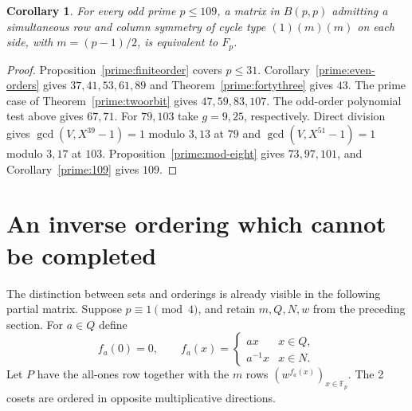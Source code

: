 \documentclass[11pt,a4paper]{article}
\newtheorem{corollary}[theorem]{Corollary}
\numberwithin{equation}{section}
\begin{document}
\begin{corollary}\label{prime:through109}
For every odd prime $p\le109$, a matrix in $B(p,p)$ admitting a simultaneous row and column symmetry of cycle type $(1)(m)(m)$ on each side, with $m=(p-1)/2$, is equivalent to $F_p$.
\end{corollary}
\begin{proof}
Proposition~\ref{prime:finiteorder} covers $p\le31$. Corollary~\ref{prime:even-orders} gives $37,41,53,61,89$ and Theorem~\ref{prime:fortythree} gives $43$. The prime case of Theorem~\ref{prime:twoorbit} gives $47,59,83,107$. The odd-order polynomial test above gives $67,71$. For $79,103$ take $g=9,25$, respectively. Direct division gives $\gcd(V,X^{39}-1)=1$ modulo $3,13$ at $79$ and $\gcd(V,X^{51}-1)=1$ modulo $3,17$ at $103$. Proposition~\ref{prime:mod-eight} gives $73,97,101$, and Corollary~\ref{prime:109} gives $109$.
\end{proof}

\section{An inverse ordering which cannot be completed}\label{sec:inverse}

The distinction between sets and orderings is already visible in the following partial matrix. Suppose $p\equiv1\pmod4$, and retain $m,Q,N,w$ from the preceding section. For $a\in Q$ define
\begin{equation}\label{prime:inverse-rows}
f_a(0)=0,\qquad f_a(x)=\begin{cases}ax&x\in Q,\\a^{-1}x&x\in N.\end{cases}
\end{equation}
Let $P$ have the all-ones row together with the $m$ rows $(w^{f_a(x)})_{x\in\mathbb F_p}$. The 2 cosets are ordered in opposite multiplicative directions.
\end{document}
